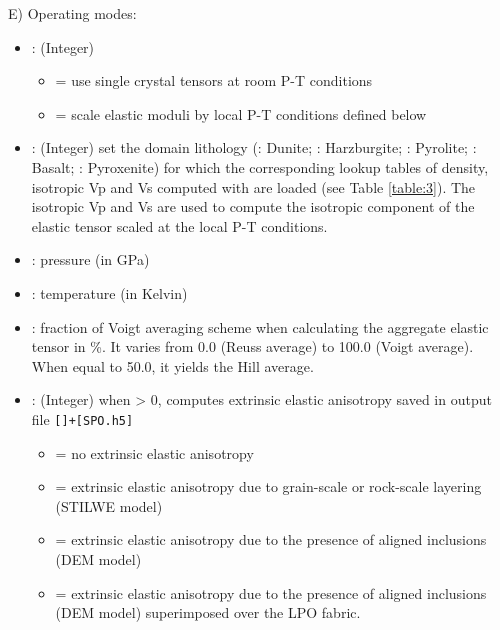 E) Operating modes:
\begin{itemize}

    \item {}: (Integer)
    \begin{itemize}
        \item[]  = use single crystal tensors at room P-T conditions
        \item[]  = scale elastic moduli by local P-T conditions defined below
    \end{itemize}
    \item {}:  (Integer) set the domain lithology (: Dunite; : Harzburgite; : Pyrolite; : Basalt; : Pyroxenite) for which the corresponding lookup tables of density, isotropic Vp and Vs computed with \mmaeostitle{} are loaded (see Table \ref{table:3}). The isotropic Vp and Vs are used to compute the isotropic component of the elastic tensor scaled at the local P-T conditions.
    \item {}: pressure (in GPa)
    \item {}: temperature (in Kelvin)
    \item {}: fraction of Voigt averaging scheme when calculating the aggregate elastic tensor in \%. It varies from 0.0 (Reuss average) to 100.0 (Voigt average). When equal to 50.0, it yields the Hill average.
    
    \item {}:  (Integer) when > 0, computes extrinsic elastic anisotropy\footnotemark{} saved in output file \texttt{[]+[SPO.h5]}
    \begin{itemize}
        \item[]  = no extrinsic elastic anisotropy
        \item[]  = extrinsic elastic anisotropy due to grain-scale or rock-scale layering (STILWE model)
        \item[]  = extrinsic elastic anisotropy due to the presence of aligned inclusions (DEM model)
        \item[]  = extrinsic elastic anisotropy due to the presence of aligned inclusions (DEM model) superimposed over the LPO fabric.
    \end{itemize}
\end{itemize}


